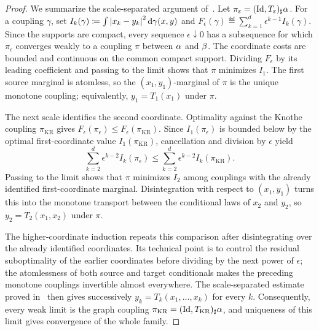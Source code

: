 \begin{proof}
		We summarize the scale-separated argument of~\cite{carlier2010knothe}. Let $\pi_\varepsilon=(\mathrm{Id},T_\varepsilon)_\sharp\alpha$. For a coupling $\gamma$, set $I_k(\gamma)\coloneqq\int\left\lvert x_k-y_k\right\rvert^2\mathrm{d}\gamma(x,y)$ and $F_\epsilon(\gamma)\eqdef\sum_{k=1}^d\epsilon^{k-1}I_k(\gamma)$.
	Since the supports are compact, every sequence $\epsilon\downarrow0$ has a subsequence for which $\pi_\epsilon$ converges weakly to a coupling $\pi$ between $\alpha$ and $\beta$. The coordinate costs are bounded and continuous on the common compact support. Dividing $F_\epsilon$ by its leading coefficient and passing to the limit shows that $\pi$ minimizes $I_1$. The first source marginal is atomless, so the $(x_1,y_1)$-marginal of $\pi$ is the unique monotone coupling; equivalently, $y_1=T_1(x_1)$ under $\pi$.

	The next scale identifies the second coordinate. Optimality against the Knothe coupling $\pi_{\mathrm{KR}}$ gives $F_\epsilon(\pi_\epsilon)\leq F_\epsilon(\pi_{\mathrm{KR}})$. Since $I_1(\pi_\epsilon)$ is bounded below by the optimal first-coordinate value $I_1(\pi_{\mathrm{KR}})$, cancellation and division by $\epsilon$ yield
	\[
		\sum_{k=2}^d\epsilon^{k-2}I_k(\pi_\epsilon)
		\leq\sum_{k=2}^d\epsilon^{k-2}I_k(\pi_{\mathrm{KR}}).
	\]
	Passing to the limit shows that $\pi$ minimizes $I_2$ among couplings with the already identified first-coordinate marginal. Disintegration with respect to $(x_1,y_1)$ turns this into the monotone transport between the conditional laws of $x_2$ and $y_2$, so $y_2=T_2(x_1,x_2)$ under $\pi$.

	The higher-coordinate induction repeats this comparison after disintegrating over the already identified coordinates. Its technical point is to control the residual suboptimality of the earlier coordinates before dividing by the next power of $\epsilon$; the atomlessness of both source and target conditionals makes the preceding monotone couplings invertible almost everywhere. The scale-separated estimate proved in~\cite{carlier2010knothe} then gives successively $y_k=T_k(x_1,\ldots,x_k)$ for every $k$. Consequently, every weak limit is the graph coupling $\pi_{\mathrm{KR}}=(\mathrm{Id},T_{\mathrm{KR}})_\sharp\alpha$, and uniqueness of this limit gives convergence of the whole family.


\end{proof}
